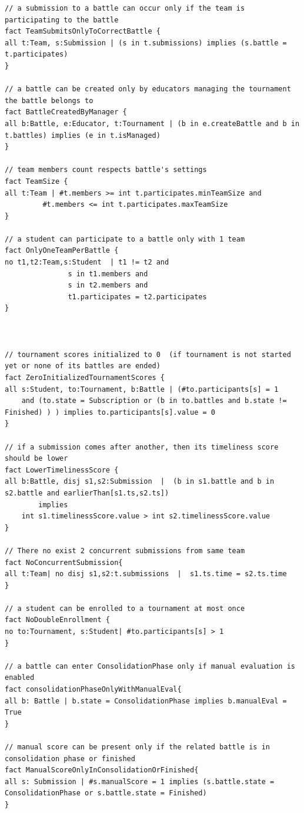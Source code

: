 \begin{lstlisting}[language=alloy]
// a submission to a battle can occur only if the team is participating to the battle
fact TeamSubmitsOnlyToCorrectBattle {
all t:Team, s:Submission | (s in t.submissions) implies (s.battle = t.participates)
}

// a battle can be created only by educators managing the tournament the battle belongs to
fact BattleCreatedByManager {
all b:Battle, e:Educator, t:Tournament | (b in e.createBattle and b in t.battles) implies (e in t.isManaged)
}

// team members count respects battle's settings
fact TeamSize {
all t:Team | #t.members >= int t.participates.minTeamSize and
	     #t.members <= int t.participates.maxTeamSize
}

// a student can participate to a battle only with 1 team
fact OnlyOneTeamPerBattle {
no t1,t2:Team,s:Student  | t1 != t2 and
			   s in t1.members and
			   s in t2.members and
			   t1.participates = t2.participates
}



// tournament scores initialized to 0  (if tournament is not started yet or none of its battles are ended)
fact ZeroInitializedTournamentScores {
all s:Student, to:Tournament, b:Battle | (#to.participants[s] = 1 
	and (to.state = Subscription or (b in to.battles and b.state != Finished) ) ) implies to.participants[s].value = 0
}

// if a submission comes after another, then its timeliness score should be lower
fact LowerTimelinessScore {
all b:Battle, disj s1,s2:Submission  |  (b in s1.battle and b in s2.battle and earlierThan[s1.ts,s2.ts]) 
    	implies 
    int s1.timelinessScore.value > int s2.timelinessScore.value
}

// There no exist 2 concurrent submissions from same team
fact NoConcurrentSubmission{
all t:Team| no disj s1,s2:t.submissions  |  s1.ts.time = s2.ts.time
}

// a student can be enrolled to a tournament at most once
fact NoDoubleEnrollment {
no to:Tournament, s:Student| #to.participants[s] > 1 
}

// a battle can enter ConsolidationPhase only if manual evaluation is enabled
fact consolidationPhaseOnlyWithManualEval{
all b: Battle | b.state = ConsolidationPhase implies b.manualEval = True
}

// manual score can be present only if the related battle is in consolidation phase or finished
fact ManualScoreOnlyInConsolidationOrFinished{
all s: Submission | #s.manualScore = 1 implies (s.battle.state = ConsolidationPhase or s.battle.state = Finished)
}


\end{lstlisting}
